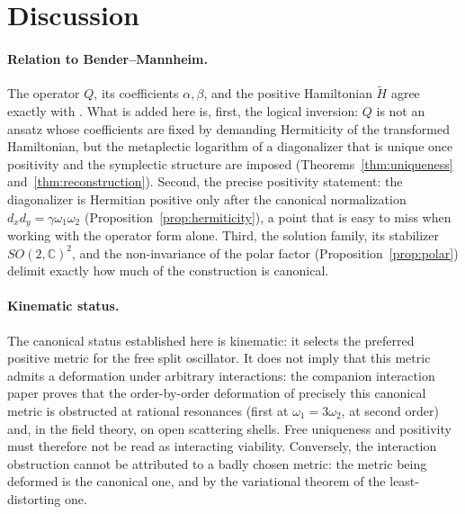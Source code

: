 \documentclass[11pt]{article}
\theoremstyle{definition}
\theoremstyle{remark}
\newcommand{\C}{\mathbb{C}}
\newcommand{\w}{\omega}
\begin{document}
\section{Discussion}\label{sec:discussion}

\paragraph{Relation to Bender--Mannheim.}
The operator $Q$, its coefficients $\alpha,\beta$, and the positive
Hamiltonian $\widetilde H$ agree exactly with
\cite{BM2008PRL,BM2008PRD}.  What is added here is, first, the logical
inversion: $Q$ is not an ansatz whose coefficients are fixed by demanding
Hermiticity of the transformed Hamiltonian, but the metaplectic logarithm of
a diagonalizer that is unique once positivity and the symplectic structure
are imposed (Theorems~\ref{thm:uniqueness} and~\ref{thm:reconstruction}).
Second, the precise positivity statement: the diagonalizer is Hermitian
positive only after the canonical normalization $d_xd_y=\gamma\w_1\w_2$
(Proposition~\ref{prop:hermiticity}), a point that is easy to miss when
working with the operator form alone.  Third, the solution family, its
stabilizer $SO(2,\C)^2$, and the non-invariance of the polar factor
(Proposition~\ref{prop:polar}) delimit exactly how much of the construction
is canonical.

\paragraph{Kinematic status.}
The canonical status established here is kinematic: it selects the
preferred positive metric for the free split oscillator.  It does not
imply that this metric admits a deformation under arbitrary
interactions: the companion interaction paper \cite{companionV} proves
that the order-by-order deformation of precisely this canonical metric
is obstructed at rational resonances (first at $\w_1=3\w_2$, at second
order) and, in the field theory, on open scattering shells.  Free
uniqueness and positivity must therefore not be read as interacting
viability.  Conversely, the interaction obstruction cannot be attributed
to a badly chosen metric: the metric being deformed is the canonical
one, and by the variational theorem of \cite{companionMD} the
least-distorting one.
\end{document}
